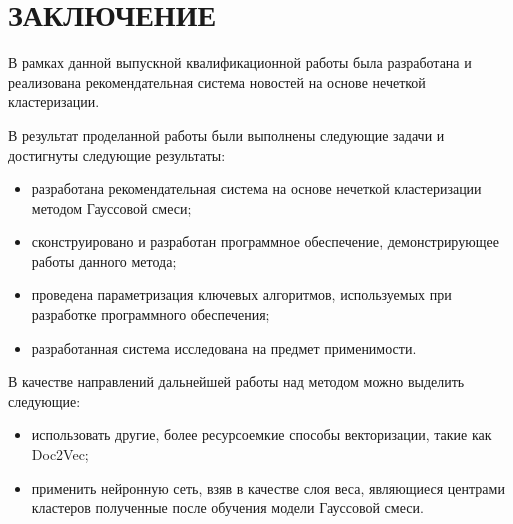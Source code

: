 \section*{ЗАКЛЮЧЕНИЕ}

В рамках данной выпускной квалификационной работы была разработана и реализована рекомендательная система новостей на основе нечеткой кластеризации.

В результат проделанной работы были выполнены следующие задачи и достигнуты следующие результаты:

\begin{itemize}
	\item разработана рекомендательная система на основе нечеткой кластеризации методом Гауссовой смеси;
	\item сконструировано и разработан программное обеспечение, демонстрирующее работы данного метода;
	\item проведена параметризация ключевых алгоритмов, используемых при разработке программного обеспечения;
	\item разработанная система исследована на предмет применимости.
\end{itemize}

В качестве направлений дальнейшей работы над методом можно выделить следующие:

\begin{itemize}
	\item использовать другие, более ресурсоемкие способы векторизации, такие как Doc2Vec;
	\item применить нейронную сеть, взяв в качестве слоя веса, являющиеся центрами кластеров полученные после обучения модели Гауссовой смеси.
\end{itemize}

\pagebreak